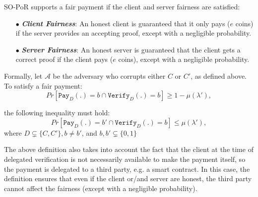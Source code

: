 \begin{definition}\label{Fair-Payment}  SO-PoR supports a fair payment if the client and server fairness are satisfied: 

\begin{itemize}
\item[$\bullet$] \textit{\textbf{Client Fairness}}: An honest client is guaranteed that it only pays ($e$ coins) if the server provides an accepting proof, except with a negligible probability. 
\item[$\bullet$]\textit{\textbf{Server Fairness}}: An honest server is guaranteed that the client gets a correct proof if the client pays ($e$ coins),   except with a negligible probability. 
\end{itemize}
Formally, let $\mathcal{A}$ be the adversary who corrupts either $C$ or $C'$, as defined above. To satisfy a fair payment:
\begin{equation}
Pr[\mathtt{Pay}_{\scriptscriptstyle D}(.)=b 	\cap  \mathtt{Verify}_{\scriptscriptstyle D}(.)=b]\geq 1-\mu(\lambda'),   
\end{equation}

the following inequality must hold:
\begin{equation}\label{inequ::fair-payment}
Pr[\mathtt{Pay}_{\scriptscriptstyle D}(.)=b' 	\cap \mathtt{Verify}_{\scriptscriptstyle D}(.)=b] \leq \mu(\lambda'),
\end{equation}
where $D\subsetneq\{C,C'\},b\neq b'$, and $b, b'\subsetneq\{0,1\}$









\end{definition}

The above definition also takes into account the fact that the client at the time of delegated verification is not necessarily available to make the payment itself, so the payment is delegated to a third party, e.g. a smart contract. In this case, the definition  ensures that even if  the client or/and server are honest, the third party cannot affect  the fairness (except with a negligible probability).

